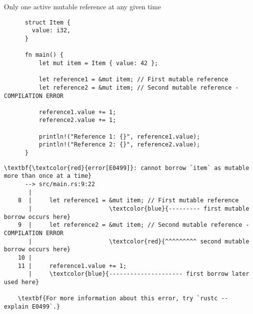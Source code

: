\documentclass{beamer}
\begin{document}
\begin{frame}[fragile]{Only one active mutable reference at any given time}
  \begin{listing}
    \begin{verbatim}
      struct Item {
        value: i32,
      }
      
      fn main() {
          let mut item = Item { value: 42 };
      
          let reference1 = &mut item; // First mutable reference
          let reference2 = &mut item; // Second mutable reference - COMPILATION ERROR
      
          reference1.value += 1;
          reference2.value += 1;
      
          println!("Reference 1: {}", reference1.value);
          println!("Reference 2: {}", reference2.value);
      }
    \end{verbatim}
  \end{listing}

  \begin{listing}
    \tiny
    \begin{Verbatim}[commandchars=\\\{\}]
      \textbf{\textcolor{red}{error[E0499]}: cannot borrow `item` as mutable more than once at a time}
      --> src/main.rs:9:22
       |
    8  |     let reference1 = &mut item; // First mutable reference
       |                      \textcolor{blue}{--------- first mutable borrow occurs here}
    9  |     let reference2 = &mut item; // Second mutable reference - COMPILATION ERROR
       |                      \textcolor{red}{^^^^^^^^^ second mutable borrow occurs here}
    10 |
    11 |     reference1.value += 1;
       |     \textcolor{blue}{--------------------- first borrow later used here}
    
    \textbf{For more information about this error, try `rustc --explain E0499`.}
    \end{Verbatim}
  \end{listing}
\end{frame}
\end{document}
